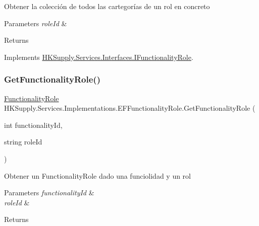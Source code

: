 Obtener la colección de todos las cartegorías de un rol en concreto 


\begin{DoxyParams}{Parameters}
{\em role\+Id} & \\
\hline
\end{DoxyParams}
\begin{DoxyReturn}{Returns}

\end{DoxyReturn}


Implements \hyperlink{interface_h_k_supply_1_1_services_1_1_interfaces_1_1_i_functionality_role}{H\+K\+Supply.\+Services.\+Interfaces.\+I\+Functionality\+Role}.

\mbox{\label{class_h_k_supply_1_1_services_1_1_implementations_1_1_e_f_functionality_role_a1900a194c92ba75d17fe42830190895f}} 
\subsubsection{\texorpdfstring{Get\+Functionality\+Role()}{GetFunctionalityRole()}}
{\footnotesize\ttfamily \hyperlink{class_h_k_supply_1_1_models_1_1_functionality_role}{Functionality\+Role} H\+K\+Supply.\+Services.\+Implementations.\+E\+F\+Functionality\+Role.\+Get\+Functionality\+Role (\begin{DoxyParamCaption}\item[{int}]{functionality\+Id,  }\item[{string}]{role\+Id }\end{DoxyParamCaption})}



Obtener un Functionality\+Role dado una funciolidad y un rol 


\begin{DoxyParams}{Parameters}
{\em functionality\+Id} & \\
\hline
{\em role\+Id} & \\
\hline
\end{DoxyParams}
\begin{DoxyReturn}{Returns}

\end{DoxyReturn}


